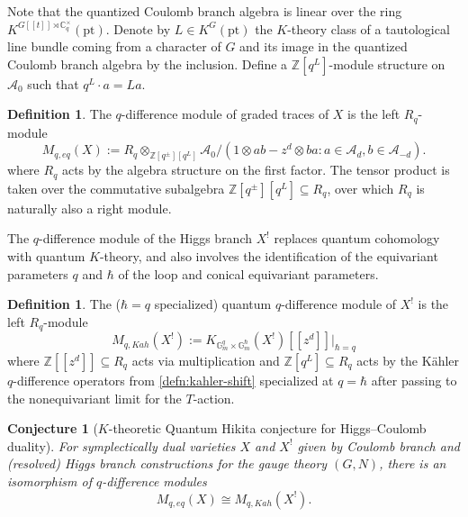 \documentclass[reqno]{amsart}
\numberwithin{equation}{section}
\numberwithin{equation}{section}
\numberwithin{equation}{section}
\newtheorem{conj}[thm]{Conjecture}
\theoremstyle{definition}
\newtheorem{defn}[thm]{Definition}
\theoremstyle{remark}
\theoremstyle{remark}
\begin{document}
Note that the quantized Coulomb branch algebra is linear over the ring $K^{G[\![t]\!] \rtimes \mathbb{C}^\times_q} (\mathrm{pt})$. Denote by $L \in K^G(\mathrm{pt})$ the $K$-theory class of a tautological line bundle coming from a character of $G$ and its image in the quantized Coulomb branch algebra by the inclusion. Define a $\mathbb{Z}[q^L]$-module structure on $\mathcal{A}_0$ such that $q^L \cdot a = L a$.


\begin{defn}
    The $q$-difference module of graded traces of $X$ is the left $R_q$-module
    \begin{equation}\label{eqn:graded-trace-module}
        M_{q, eq}(X) := R_q \otimes_{\mathbb{Z}[q^\pm][q^L]} \mathcal{A}_0 / ( 1 \otimes ab - z^d \otimes ba : a \in \mathcal{A}_{d}, b \in \mathcal{A}_{-d}).
    \end{equation}
    where $R_q$ acts by the algebra structure on the first factor. The tensor product is taken over the commutative subalgebra $\mathbb{Z}[q^\pm][q^L] \subseteq R_q$, over which $R_q$ is naturally also a right module.
\end{defn}

The $q$-difference module of the Higgs branch $X^!$ replaces quantum cohomology with quantum $K$-theory, and also involves the identification of the equivariant parameters $q$ and $\hbar$ of the loop and conical equivariant parameters.

\begin{defn}
    The ($\hbar=q$ specialized) quantum $q$-difference module of $X^!$ is the left $R_q$-module
    \begin{equation}
        M_{q, Kah}(X^!) := K_{\mathbb{G}_m^q \times \mathbb{G}_m^{\hbar}}(X^!)[\![z^d]\!]|_{\hbar = q}
    \end{equation}
    where $\mathbb{Z}[\![z^d]\!] \subseteq R_q$ acts via multiplication and $\mathbb{Z}[q^L] \subseteq R_q$ acts by the K\"ahler $q$-difference operators from \cref{defn:kahler-shift} specialized at $q = \hbar$ after passing to the nonequivariant limit for the $T$-action.
\end{defn}

\begin{conj}[$K$-theoretic Quantum Hikita conjecture for Higgs--Coulomb duality]\label{conj:K-quantum-hikita}
    For symplectically dual varieties $X$ and $X^!$ given by Coulomb branch and (resolved) Higgs branch constructions for the gauge theory $(G,N)$, there is an isomorphism of $q$-difference modules
    \begin{equation}
        M_{q, eq}(X) \cong M_{q, Kah}(X^!).
    \end{equation}
\end{conj}
\end{document}
